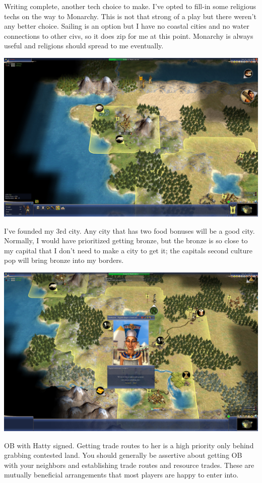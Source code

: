 \documentclass[10pt]{article}
\begin{document}
Writing complete, another tech choice to make. I've opted to fill-in some religious techs on the way to
Monarchy. This is not that strong of a play but there weren't any better choice. Sailing is an option but
I have no coastal cities and no water connections to other civs, so it does zip for me at this point. Monarchy
is always useful and religions should spread to me eventually.

\includegraphics[width=1.0\textwidth]{24}

I've founded my 3rd city. Any city that has two food bonuses will be a good city. Normally, I would
have prioritized getting bronze, but the bronze is so close to my capital that I don't need to make
a city to get it; the capitals second culture pop will bring bronze into my borders.

\includegraphics[width=1.0\textwidth]{25}

OB with Hatty signed. Getting trade routes to her is a high priority only behind grabbing contested land.
You should generally be assertive about getting OB with your neighbors and establishing trade routes and
resource trades. These are mutually beneficial arrangements that most players are happy to enter into.
\end{document}

